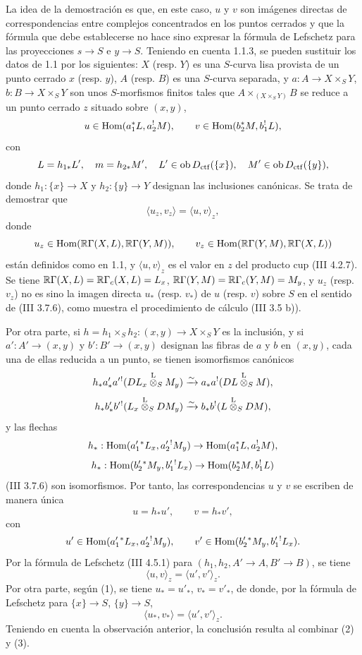 La idea de la demostración es que, en este caso, $u$ y $v$ son imágenes directas de correspondencias entre complejos concentrados en los puntos cerrados y que la fórmula que debe establecerse no hace sino expresar la fórmula de Lefschetz para las proyecciones $s\to S$ e $y\to S$. Teniendo en cuenta 1.1.3, se pueden sustituir los datos de 1.1 por los siguientes: $X$ (resp. $Y$) es una $S$-curva lisa provista de un punto cerrado $x$ (resp. $y$), $A$ (resp. $B$) es una $S$-curva separada, y $a:A\to X\times_S Y$, $b:B\to X\times_S Y$ son unos $S$-morfismos finitos tales que $A\times_{(X\times_SY)}B$ se reduce a un punto cerrado $z$ situado sobre $(x,y)$,
\[
u\in\operatorname{Hom}(a_1^*L,a_2^!M),\qquad v\in\operatorname{Hom}(b_2^*M,b_1^!L),
\]
con
\[
L=h_{1*}L',\quad m=h_{2*}M',\quad
L'\in\operatorname{ob} D_{\mathrm{ctf}}(\{x\}),\quad M'\in\operatorname{ob} D_{\mathrm{ctf}}(\{y\}),
\]
donde $h_1:\{x\}\to X$ y $h_2:\{y\}\to Y$ designan las inclusiones canónicas. Se trata de demostrar que
\[
\langle u_z,v_z\rangle=\langle u,v\rangle_z,
\]
donde
\[
u_z\in\operatorname{Hom}(\mathbb{R}\Gamma(X,L),\mathbb{R}\Gamma(Y,M)),\qquad
v_z\in\operatorname{Hom}(\mathbb{R}\Gamma(Y,M),\mathbb{R}\Gamma(X,L))
\]
están definidos como en 1.1, y $\langle u,v\rangle_z$ es el valor en $z$ del producto cup (III 4.2.7). Se tiene $\mathbb{R}\Gamma(X,L)=\mathbb{R}\Gamma_c(X,L)=L_x$, $\mathbb{R}\Gamma(Y,M)=\mathbb{R}\Gamma_c(Y,M)=M_y$, y $u_z$ (resp. $v_z$) no es sino la imagen directa $u_*$ (resp. $v_*$) de $u$ (resp. $v$) sobre $S$ en el sentido de (III 3.7.6), como muestra el procedimiento de cálculo (III 3.5 b)).

Por otra parte, si $h=h_1\times_Sh_2:(x,y)\to X\times_SY$ es la inclusión, y si $a':A'\to(x,y)$ y $b':B'\to(x,y)$ designan las fibras de $a$ y $b$ en $(x,y)$, cada una de ellas reducida a un punto, se tienen isomorfismos canónicos
\[
h_*a'_*a'{}^!(DL_x\overset{\mathrm L}{\otimes}_SM_y)
 \xrightarrow{\sim} a_*a^!(DL\overset{\mathrm L}{\otimes}_SM),
\]
\[
h_*b'_*b'{}^!(L_x\overset{\mathrm L}{\otimes}_SDM_y)
 \xrightarrow{\sim} b_*b^!(L\overset{\mathrm L}{\otimes}_SDM),
\]
y las flechas
\[
h_*:\operatorname{Hom}(a_1'{}^*L_x,a_2'{}^!M_y)\to \operatorname{Hom}(a_1^*L,a_2^!M),
\]
\[
h_*:\operatorname{Hom}(b_2'{}^*M_y,b_1'{}^!L_x)\to \operatorname{Hom}(b_2^*M,b_1^!L)
\]
(III 3.7.6) son isomorfismos. Por tanto, las correspondencias $u$ y $v$ se escriben de manera única
\begin{equation}\tag{1}
u=h_*u',\qquad v=h_*v',
\end{equation}
con
\[
u'\in\operatorname{Hom}(a_1'{}^*L_x,a_2'{}^!M_y),\qquad
v'\in\operatorname{Hom}(b_2'{}^*M_y,b_1'{}^!L_x).
\]
Por la fórmula de Lefschetz (III 4.5.1) para $(h_1,h_2,A'\to A,B'\to B)$, se tiene
\begin{equation}\tag{2}
\langle u,v\rangle_z=\langle u',v'\rangle_z .
\end{equation}
Por otra parte, según (1), se tiene $u_*=u'_*$, $v_*=v'_*$, de donde, por la fórmula de Lefschetz para $\{x\}\to S$, $\{y\}\to S$,
\begin{equation}\tag{3}
\langle u_*,v_*\rangle=\langle u',v'\rangle_z .
\end{equation}
Teniendo en cuenta la observación anterior, la conclusión resulta al combinar (2) y (3).
